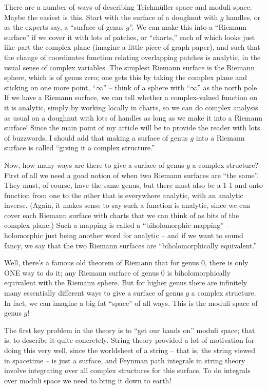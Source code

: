 \documentclass{article}
\begin{document}
There are a number of ways of describing Teichm\"uller space and moduli
space. Maybe the easiest is this. Start with the surface of a doughnut
with \(g\) handles, or as the experts say, a ``surface of genus \(g\)''.
We can make this into a ``Riemann surface'' if we cover it with lots of
patches, or ``charts,'' each of which looks just like part the complex
plane (imagine a little piece of graph paper), and such that the change
of coordinates function relating overlapping patches is analytic, in the
usual sense of complex variables. The simplest Riemann surface is the
Riemann sphere, which is of genus zero; one gets this by taking the
complex plane and sticking on one more point, ``\(\infty\)'' -- think of
a sphere with ``\(\infty\)'' as the north pole. If we have a Riemann
surface, we can tell whether a complex-valued function on it is
analytic, simply by working locally in charts, so we can do complex
analysis as usual on a doughnut with lots of handles as long as we make
it into a Riemann surface! Since the main point of my article will be to
provide the reader with lots of buzzwords, I should add that making a
surface of genus \(g\) into a Riemann surface is called ``giving it a
complex structure.''

Now, how many ways are there to give a surface of genus \(g\) a complex
structure? First of all we need a good notion of when two Riemann
surfaces are ``the same''. They must, of course, have the same genus,
but there must also be a 1-1 and onto function from one to the other
that is everywhere analytic, with an analytic inverse. (Again, it makes
sense to say such a function is analytic, since we can cover each
Riemann surface with charts that we can think of as bits of the complex
plane.) Such a mapping is called a ``biholomorphic mapping'' --
holomorphic just being another word for analytic -- and if we want to
sound fancy, we say that the two Riemann surfaces are
``biholomorphically equivalent.''

Well, there's a famous old theorem of Riemann that for genus 0, there is
only ONE way to do it; any Riemann surface of genus 0 is
biholomorphically equivalent with the Riemann sphere. But for higher
genus there are infinitely many essentially different ways to give a
surface of genus \(g\) a complex structure. In fact, we can imagine a
big fat ``space'' of all ways. This is the moduli space of genus \(g\)!

The first key problem in the theory is to ``get our hands on'' moduli
space; that is, to describe it quite concretely. String theory provided
a lot of motivation for doing this very well, since the worldsheet of a
string -- that is, the string viewed in spacetime -- is just a surface,
and Feynman path integrals in string theory involve integrating over all
complex structures for this surface. To do integrals over moduli space
we need to bring it down to earth!
\end{document}
